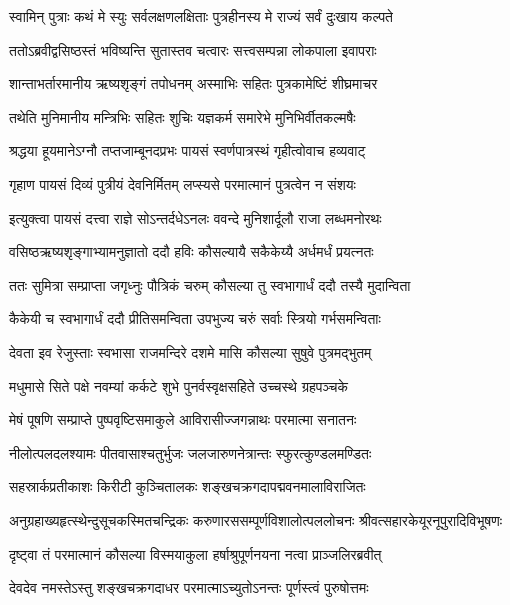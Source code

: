 \twolineshloka
{स्वामिन् पुत्राः कथं मे स्युः सर्वलक्षणलक्षिताः}
{पुत्रहीनस्य मे राज्यं सर्वं दुःखाय कल्पते} %

\twolineshloka
{ततोऽब्रवीद्वसिष्ठस्तं भविष्यन्ति सुतास्तव}
{चत्वारः सत्त्वसम्पन्ना लोकपाला इवापराः} %

\twolineshloka
{शान्ताभर्तारमानीय ऋष्यशृङ्गं तपोधनम्}
{अस्माभिः सहितः पुत्रकामेष्टिं शीघ्रमाचर} %

\twolineshloka
{तथेति मुनिमानीय मन्त्रिभिः सहितः शुचिः}
{यज्ञकर्म समारेभे मुनिभिर्वीतकल्मषैः} %

\twolineshloka
{श्रद्धया हूयमानेऽग्नौ तप्तजाम्बूनदप्रभः}
{पायसं स्वर्णपात्रस्थं गृहीत्वोवाच हव्यवाट्} %

\twolineshloka
{गृहाण पायसं दिव्यं पुत्रीयं देवनिर्मितम्}
{लप्स्यसे परमात्मानं पुत्रत्वेन न संशयः} %

\twolineshloka
{इत्युक्त्वा पायसं दत्त्वा राज्ञे सोऽन्तर्दधेऽनलः}
{ववन्दे मुनिशार्दूलौ राजा लब्धमनोरथः} %

\twolineshloka
{वसिष्ठऋष्यशृङ्गाभ्यामनुज्ञातो ददौ हविः}
{कौसल्यायै सकैकेय्यै अर्धमर्धं प्रयत्नतः} %

\twolineshloka
{ततः सुमित्रा सम्प्राप्ता जगृध्नुः पौत्रिकं चरुम्}
{कौसल्या तु स्वभागार्धं ददौ तस्यै मुदान्विता} %

\twolineshloka
{कैकेयी च स्वभागार्धं ददौ प्रीतिसमन्विता}
{उपभुज्य चरुं सर्वाः स्त्रियो गर्भसमन्विताः} %

\twolineshloka
{देवता इव रेजुस्ताः स्वभासा राजमन्दिरे}
{दशमे मासि कौसल्या सुषुवे पुत्रमद्भुतम्} %

\twolineshloka
{मधुमासे सिते पक्षे नवम्यां कर्कटे शुभे}
{पुनर्वस्वृक्षसहिते उच्चस्थे ग्रहपञ्चके} %

\twolineshloka
{मेषं पूषणि सम्प्राप्ते पुष्पवृष्टिसमाकुले}
{आविरासीज्जगन्नाथः परमात्मा सनातनः} %

\twolineshloka
{नीलोत्पलदलश्यामः पीतवासाश्चतुर्भुजः}
{जलजारुणनेत्रान्तः स्फुरत्कुण्डलमण्डितः} %

\twolineshloka
{सहस्रार्कप्रतीकाशः किरीटी कुञ्चितालकः}
{शङ्खचक्रगदापद्मवनमालाविराजितः} %

\threelineshloka
{अनुग्रहाख्यहृत्स्थेन्दुसूचकस्मितचन्द्रिकः}
{करुणारससम्पूर्णविशालोत्पललोचनः}
{श्रीवत्सहारकेयूरनूपुरादिविभूषणः} %

\twolineshloka
{दृष्ट्वा तं परमात्मानं कौसल्या विस्मयाकुला}
{हर्षाश्रुपूर्णनयना नत्वा प्राञ्जलिरब्रवीत्} %


\twolineshloka
{देवदेव नमस्तेऽस्तु शङ्खचक्रगदाधर}
{परमात्माऽच्युतोऽनन्तः पूर्णस्त्वं पुरुषोत्तमः} %

